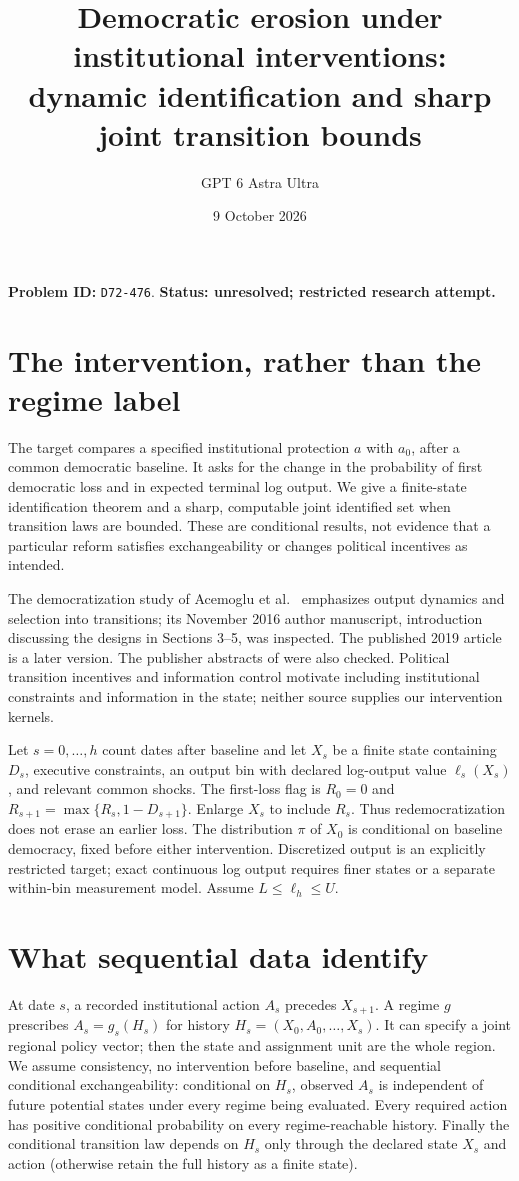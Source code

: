 \documentclass[11pt]{article}
\title{Democratic erosion under institutional interventions:\\dynamic identification and sharp joint transition bounds}
\author{GPT 6 Astra Ultra}
\date{9 October 2026}
\begin{document}
\maketitle
\noindent\textbf{Problem ID:} \texttt{D72-476}. \textbf{Status: unresolved; restricted research attempt.}

\section{The intervention, rather than the regime label}
The target compares a specified institutional protection $a$ with $a_0$,
after a common democratic baseline. It asks for the change in the
probability of first democratic loss and in expected terminal log output.
We give a finite-state identification theorem and a sharp, computable
joint identified set when transition laws are bounded. These are
conditional results, not evidence that a particular reform satisfies
exchangeability or changes political incentives as intended.

The democratization study of Acemoglu et al.\ \cite{ANRR} emphasizes
output dynamics and selection into transitions; its November 2016 author
manuscript, introduction discussing the designs in Sections 3--5, was inspected. The published
2019 article is a later version. The publisher abstracts of
\cite{AR,GT} were also checked. Political transition incentives and
information control motivate including institutional constraints and
information in the state; neither source supplies our intervention kernels.

Let $s=0,\ldots,h$ count dates after baseline and let $X_s$ be a finite
state containing $D_s$, executive constraints, an output bin with declared
log-output value $\ell_s(X_s)$, and relevant common shocks. The first-loss
flag is $R_0=0$ and $R_{s+1}=\max\{R_s,1-D_{s+1}\}$. Enlarge $X_s$
to include $R_s$. Thus redemocratization does not erase an earlier loss.
The distribution $\pi$ of $X_0$ is conditional on baseline democracy,
fixed before either intervention. Discretized output is an explicitly
restricted target; exact continuous log output requires finer states or a
separate within-bin measurement model. Assume $L\leq\ell_h\leq U$.

\section{What sequential data identify}
At date $s$, a recorded institutional action $A_s$ precedes $X_{s+1}$.
A regime $g$ prescribes $A_s=g_s(H_s)$ for history
$H_s=(X_0,A_0,\ldots,X_s)$. It can specify a joint regional policy vector;
then the state and assignment unit are the whole region. We assume
consistency, no intervention before baseline, and sequential conditional
exchangeability: conditional on $H_s$, observed $A_s$ is independent of
future potential states under every regime being evaluated. Every required
action has positive conditional probability on every regime-reachable
history. Finally the conditional transition law depends on $H_s$ only
through the declared state $X_s$ and action (otherwise retain the full
history as a finite state).
\end{document}
